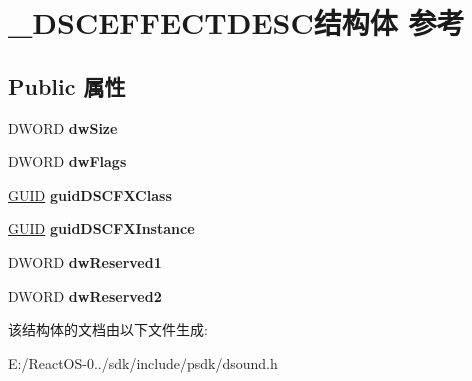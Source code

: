 \hypertarget{struct___d_s_c_e_f_f_e_c_t_d_e_s_c}{}\section{\+\_\+\+D\+S\+C\+E\+F\+F\+E\+C\+T\+D\+E\+S\+C结构体 参考}
\label{struct___d_s_c_e_f_f_e_c_t_d_e_s_c}
\subsection*{Public 属性}
\begin{DoxyCompactItemize}
\item 
\mbox{\label{struct___d_s_c_e_f_f_e_c_t_d_e_s_c_a1fae05aabab67a68b1756bf6f64f3cef}} 
D\+W\+O\+RD {\bfseries dw\+Size}
\item 
\mbox{\label{struct___d_s_c_e_f_f_e_c_t_d_e_s_c_a1280d674cb8ea7e24a6c1b332841bd28}} 
D\+W\+O\+RD {\bfseries dw\+Flags}
\item 
\mbox{\label{struct___d_s_c_e_f_f_e_c_t_d_e_s_c_afe308a57647430114167a7b9bee339a4}} 
\hyperlink{interface_g_u_i_d}{G\+U\+ID} {\bfseries guid\+D\+S\+C\+F\+X\+Class}
\item 
\mbox{\label{struct___d_s_c_e_f_f_e_c_t_d_e_s_c_a036b59532251f4d7f8be1b3b100f2e72}} 
\hyperlink{interface_g_u_i_d}{G\+U\+ID} {\bfseries guid\+D\+S\+C\+F\+X\+Instance}
\item 
\mbox{\label{struct___d_s_c_e_f_f_e_c_t_d_e_s_c_a695ddee42ba0da0027e2270ed4da07a2}} 
D\+W\+O\+RD {\bfseries dw\+Reserved1}
\item 
\mbox{\label{struct___d_s_c_e_f_f_e_c_t_d_e_s_c_acfefa4d98179ad88a6cac462e629af00}} 
D\+W\+O\+RD {\bfseries dw\+Reserved2}
\end{DoxyCompactItemize}


该结构体的文档由以下文件生成\+:\begin{DoxyCompactItemize}
\item 
E\+:/\+React\+O\+S-\/0../sdk/include/psdk/dsound.\+h\end{DoxyCompactItemize}
